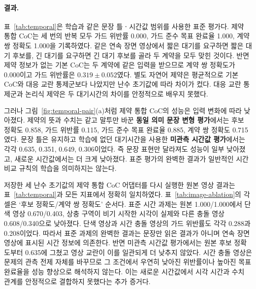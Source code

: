 \paragraph{결과.}
표~\ref{tab:temporal}은 학습과 같은 문장 틀ㆍ시간값 범위를 사용한 표준 평가다. 제약 통합 CoC는 세 번의 반복 모두 가드 위반률 0.000, 가드 준수 목표 완료율 1.000, 계약 쌍 정확도 1.000을 기록하였다. 같은 연속 장면 영상에서 짧은 대기를 요구하면 짧은 대기 후보를, 긴 대기를 요구하면 긴 대기 후보를 골라 두 계약을 모두 맞힌 것이다. 반면 제약 정보가 없는 기본 CoC는 두 계약에 같은 입력을 받으므로 계약 쌍 정확도가 0.000이고 가드 위반률은 $0.319\pm0.052$였다. 별도 자연어 제약은 평균적으로 기본 CoC와 대응 교란 통제군보다 나았지만 난수 초기값에 따라 차이가 컸다. 대응 교란 통제군과 논리식 제약은 두 대기시간의 차이를 안정적으로 배우지 못했다.

그러나 그림~\ref{fig:temporal-pair}(a)처럼 제약 통합 CoC의 성능은 입력 변화에 따라 낮아졌다. 제약의 뜻과 수치는 같고 말투만 바꾼 \textbf{동일 의미 문장 변형 평가}에서는 후보 정확도 0.858, 가드 위반률 0.115, 가드 준수 목표 완료율 0.885, 계약 쌍 정확도 0.715였다. 문장 틀은 유지하고 학습에 없던 대기시간을 사용한 \textbf{미관측 시간값 평가}에서는 각각 0.635, 0.351, 0.649, 0.306이었다. 즉 문장 표현만 달라져도 성능이 일부 낮아졌고, 새로운 시간값에서는 더 크게 낮아졌다. 표준 평가의 완벽한 결과가 일반적인 시간 비교 규칙의 학습을 의미하지는 않는다.

저장한 세 난수 초기값의 제약 통합 CoC 어댑터를 다시 실행한 원본 영상 결과는 표~\ref{tab:temporal}과 모든 지표에서 정확히 일치하였다. 표~\ref{tab:image-ablation}의 각 셀은 `후보 정확도/계약 쌍 정확도' 순서다. 표준 시간 과제는 원본 1.000/1.000에서 단색 영상 0.670/0.403, 상충 구역이 비기 시작한 시각이 실제와 다른 충돌 영상 0.608/0.340으로 낮아졌다. 단색 영상과 시간 충돌 영상의 가드 위반률도 각각 0.288과 0.208이었다. 따라서 표준 과제의 완벽한 결과는 문장만 읽은 결과가 아니며 연속 장면 영상에 표시된 시간 정보에 의존한다. 반면 미관측 시간값 평가에서는 원본 후보 정확도부터 0.635에 그쳤고 영상 교란이 이를 일관되게 더 낮추지 않았다. 시간 충돌 영상은 문제의 관측 전제 자체를 바꾸므로 그 조건에서 우연히 낮아진 위반률이나 높아진 목표 완료율을 성능 향상으로 해석하지 않는다. 이는 새로운 시간값에서 시각 시간과 수치 관계를 안정적으로 결합하지 못했다는 추가 증거다.


